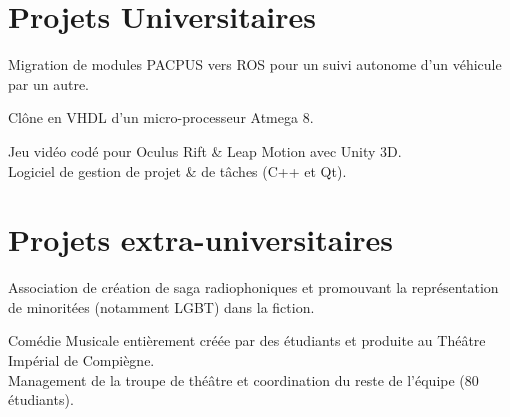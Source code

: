 \documentclass[]{cv-template}
\begin{document}
\begin{minipage}[t]{0.65\textwidth}


\section{Projets Universitaires}
Migration de modules PACPUS vers ROS pour un suivi autonome d'un véhicule par un autre.


Clône en VHDL d'un micro-processeur Atmega 8.




Jeu vidéo codé pour Oculus Rift \& Leap Motion avec Unity 3D. \\


Logiciel de gestion de projet \& de tâches (C++ et Qt).

\section{Projets extra-universitaires}
Association de création de saga radiophoniques et promouvant la représentation de minoritées (notamment LGBT) dans la fiction.

Comédie Musicale entièrement créée par des étudiants et produite au Théâtre Impérial de Compiègne. \\
Management de la troupe de théâtre et coordination du reste de l'équipe (80 étudiants).


\sectionsep 

\end{minipage} 
\end{document}
